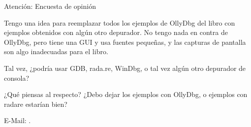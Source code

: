 \bigskip
\bigskip
\bigskip

\huge Atención: Encuesta de opinión
\normalsize

\bigskip
\bigskip
\bigskip

Tengo una idea para reemplazar todos los ejemplos de OllyDbg del libro con ejemplos obtenidos con algún otro depurador.
No tengo nada en contra de OllyDbg, pero tiene una GUI y usa fuentes pequeñas, y las capturas de pantalla son algo inadecuadas para el libro.

Tal vez, ¿podría usar GDB, rada.re, WinDbg, o tal vez algún otro depurador de consola?

¿Qué piensas al respecto?
¿Debo dejar los ejemplos con OllyDbg, o ejemplos con radare estarían bien?

E-Mail: \GTT{\EMAILS}.

\vspace*{\fill}
\vfill
